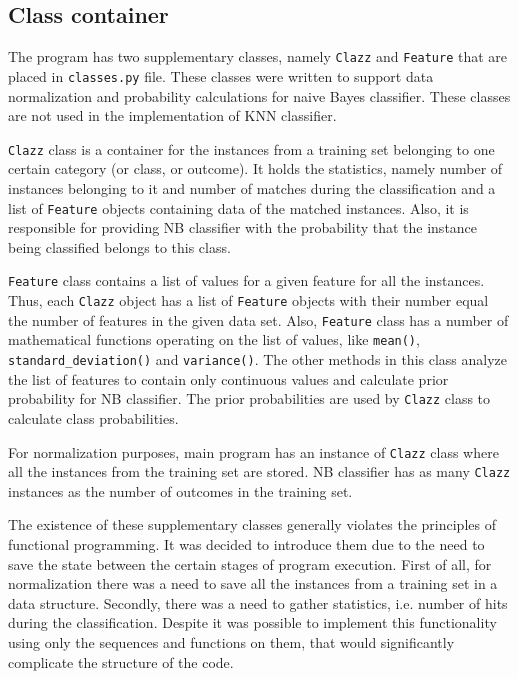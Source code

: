 \documentclass{llncs}
\begin{document}
\subsection{Class container}

The program has two supplementary classes, namely \lstinline{Clazz} and \lstinline{Feature} that are placed in \lstinline{classes.py} file. These classes were written to support data normalization and probability calculations for naive Bayes classifier. These classes are not used in the implementation of KNN classifier.

\lstinline{Clazz} class is a container for the instances from a training set belonging to one certain category (or class, or outcome). It holds the statistics, namely number of instances belonging to it and number of matches during the classification and a list of \lstinline{Feature} objects containing data of the matched instances. Also, it is responsible for providing NB classifier with the probability that the instance being classified belongs to this class.

\lstinline{Feature} class contains a list of values for a given feature for all the instances. Thus, each \lstinline{Clazz} object has a list of \lstinline{Feature} objects with their number equal the number of features in the given data set. Also, \lstinline{Feature} class has a number of mathematical functions operating on the list of values, like \lstinline{mean()}, \lstinline{standard_deviation()} and \lstinline{variance()}. The other methods in this class analyze the list of features to contain only continuous values and calculate prior probability for NB classifier. The prior probabilities are used by \lstinline{Clazz} class to calculate class probabilities.

For normalization purposes, main program has an instance of \lstinline{Clazz} class where all the instances from the training set are stored. NB classifier has as many \lstinline{Clazz} instances as the number of outcomes in the training set.

The existence of these supplementary classes generally violates the principles of functional programming. It was decided to introduce them due to the need to save the state between the certain stages of program execution. First of all, for normalization there was a need to save all the instances from a training set in a data structure. Secondly, there was a need to gather statistics, i.e. number of hits during the classification. Despite it was possible to implement this functionality using only the sequences and functions on them, that would significantly complicate the structure of the code.
\end{document}
